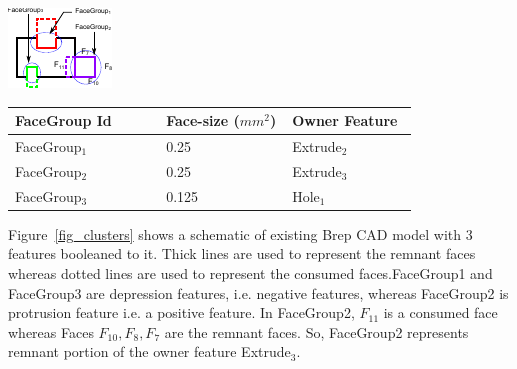 \begin{enumerate}
\begin{minipage}{\linewidth}
\begin{minipage}[c]{0.48\linewidth}
\includegraphics[width=0.8\linewidth,valign=t]{../Common/images/facegroups_1.pdf}
 \label{fig_clusters}
\end{minipage}
\hfill
\begin{minipage}[c]{0.48\linewidth}
\label{tbl_clusters}
\begin{tabular}[h]{@{} p{0.3\linewidth} p{0.25\linewidth} p{0.25\linewidth}@{}} \toprule
\textbf{FaceGroup Id} & \textbf{Face-size ($mm^2$)}& \textbf{Owner Feature}\\ \midrule
FaceGroup$_1$ & 0.25 	&  Extrude$_2$\\
FaceGroup$_2$ & 0.25  & Extrude$_3$\\
FaceGroup$_3$ & 0.125 & Hole$_1$\\ \bottomrule
\end{tabular}
\end{minipage}
\end{minipage}


Figure~\ref{fig_clusters} shows a schematic of existing Brep CAD model with 3 features booleaned to it. Thick lines are used to represent the remnant faces whereas dotted lines are used to represent the consumed faces.FaceGroup1 and FaceGroup3 are depression features, i.e. negative features, whereas FaceGroup2 is protrusion feature i.e. a positive feature. In FaceGroup2, $F_{11}$ is a consumed face whereas Faces $F_{10},F_8,F_7$ are the remnant faces. So, FaceGroup2 represents remnant portion of the owner feature Extrude$_3$.


\end{enumerate}
